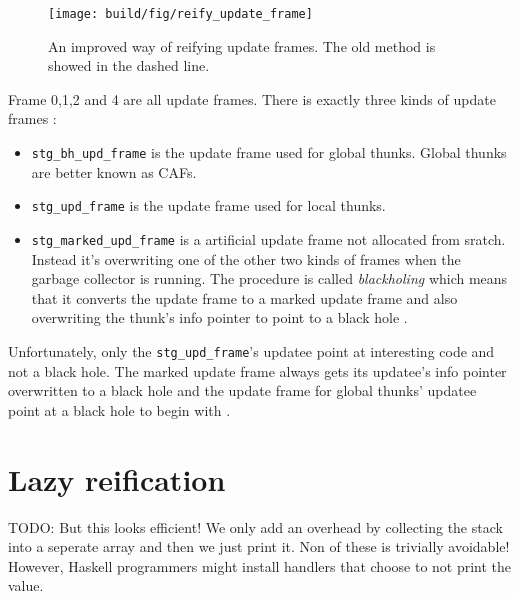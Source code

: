 \begin{figure}
\begin{mdframed}
  \texttt{[image: build/fig/reify\_update\_frame]}
  \caption{An improved way of reifying update frames. The old method is
  showed in the dashed line.}
  \label{fig:reify_update_frame}
\end{mdframed}
\end{figure}

Frame 0,1,2 and 4 are all update frames. There is exactly three kinds
of update frames \cite{github_updates_cmm}:

\begin{itemize}
  \item
    \texttt{stg\_bh\_upd\_frame} is the update frame used for global
      thunks. Global thunks are better known as CAFs.
  \item
    \texttt{stg\_upd\_frame} is the update frame used for local thunks.
  \item \texttt{stg\_marked\_upd\_frame} is a artificial update frame not
  allocated from sratch. Instead it's overwriting one of the other two
  kinds of frames when the garbage collector is running. The procedure
  is called \emph{blackholing} which means that it converts the update
  frame to a marked update frame \cite{github_overwrite_update_frame}
  and also overwriting the thunk's info pointer to point to a black hole
  \cite{github_overwrite_blackhole}.
\end{itemize}

Unfortunately, only the \texttt{stg\_upd\_frame}'s updatee point
at interesting code and not a black hole. The marked update frame
always gets its updatee's info pointer overwritten to a black
hole \cite{github_overwrite_blackhole} and the update frame
for global thunks' updatee point at a black hole to begin with
\cite{github_set_hdr_caf_blackhole}.

\section{Lazy reification}

TODO:
But this looks efficient! We only add an overhead by collecting the
stack into a seperate array and then we just print it. Non of these is
trivially avoidable! However, Haskell programmers might install handlers
that choose to not print the value.
